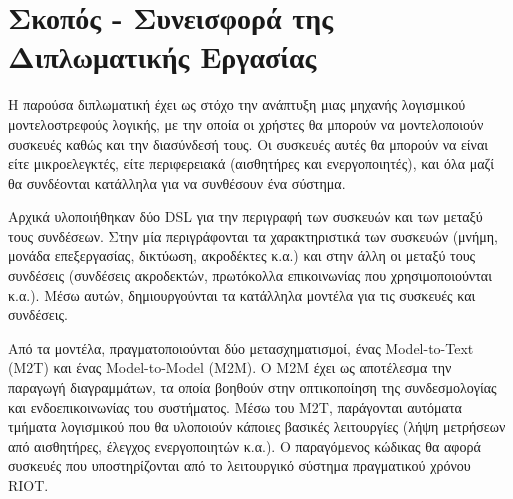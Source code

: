 \section{Σκοπός - Συνεισφορά της Διπλωματικής Εργασίας}
\label{section:contribution}

Η παρούσα διπλωματική έχει ως στόχο την ανάπτυξη μιας μηχανής λογισμικού μοντελοστρεφούς λογικής, με την οποία οι χρήστες θα μπορούν να μοντελοποιούν συσκευές καθώς και την διασύνδεσή τους. Οι συσκευές αυτές θα μπορούν να είναι είτε μικροελεγκτές, είτε περιφερειακά (αισθητήρες και ενεργοποιητές), και όλα μαζί θα συνδέονται κατάλληλα για να συνθέσουν ένα σύστημα.

Αρχικά υλοποιήθηκαν δύο DSL για την περιγραφή των συσκευών και των μεταξύ τους συνδέσεων. Στην μία περιγράφονται τα χαρακτηριστικά των συσκευών (μνήμη, μονάδα επεξεργασίας, δικτύωση, ακροδέκτες κ.α.) και στην άλλη οι μεταξύ τους συνδέσεις (συνδέσεις ακροδεκτών, πρωτόκολλα επικοινωνίας που χρησιμοποιούνται κ.α.). Μέσω αυτών, δημιουργούνται τα κατάλληλα μοντέλα για τις συσκευές και συνδέσεις.

Από τα μοντέλα, πραγματοποιούνται δύο μετασχηματισμοί, ένας Model-to-Text (M2T) και ένας Model-to-Model (M2M). Ο M2M έχει ως αποτέλεσμα την παραγωγή διαγραμμάτων, τα οποία βοηθούν στην οπτικοποίηση της συνδεσμολογίας και ενδοεπικοινωνίας του συστήματος. Μέσω του M2T, παράγονται αυτόματα τμήματα λογισμικού που θα υλοποιούν κάποιες βασικές λειτουργίες (λήψη μετρήσεων από αισθητήρες, έλεγχος ενεργοποιητών κ.α.). Ο παραγόμενος κώδικας θα αφορά συσκευές που υποστηρίζονται από το λειτουργικό σύστημα πραγματικού χρόνου RIOT.